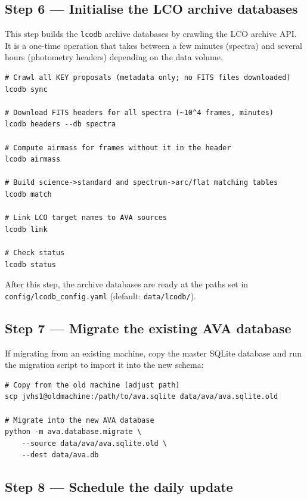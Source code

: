 \documentclass[12pt,a4paper]{article}
\begin{document}
\subsection{Step 6 --- Initialise the LCO archive databases}

This step builds the \texttt{lcodb} archive databases by crawling the LCO
archive API.  It is a one-time operation that takes between a few minutes
(spectra) and several hours (photometry headers) depending on the data volume.

\begin{lstlisting}[style=shell]
# Crawl all KEY proposals (metadata only; no FITS files downloaded)
lcodb sync

# Download FITS headers for all spectra (~10^4 frames, minutes)
lcodb headers --db spectra

# Compute airmass for frames without it in the header
lcodb airmass

# Build science->standard and spectrum->arc/flat matching tables
lcodb match

# Link LCO target names to AVA sources
lcodb link

# Check status
lcodb status
\end{lstlisting}

After this step, the archive databases are ready at the paths set in
\texttt{config/lcodb\_config.yaml} (default: \texttt{data/lcodb/}).

\subsection{Step 7 --- Migrate the existing AVA database}

If migrating from an existing machine, copy the master SQLite database and
run the migration script to import it into the new schema:

\begin{lstlisting}[style=shell]
# Copy from the old machine (adjust path)
scp jvhs1@oldmachine:/path/to/ava.sqlite data/ava/ava.sqlite.old

# Migrate into the new AVA database
python -m ava.database.migrate \
    --source data/ava/ava.sqlite.old \
    --dest data/ava.db
\end{lstlisting}

\subsection{Step 8 --- Schedule the daily update}
\end{document}
